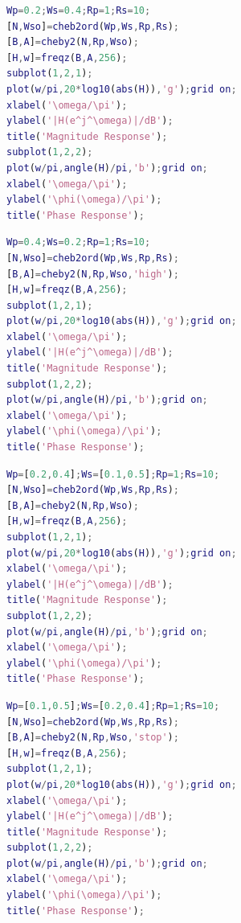 \documentclass[12pt,AutoFakeBold]{article}
\begin{document}
\begin{appendices}
\begin{lstlisting}[language=Matlab]
%低通
Wp=0.2;Ws=0.4;Rp=1;Rs=10;
[N,Wso]=cheb2ord(Wp,Ws,Rp,Rs);
[B,A]=cheby2(N,Rp,Wso);
[H,w]=freqz(B,A,256);
subplot(1,2,1);
plot(w/pi,20*log10(abs(H)),'g');grid on;
xlabel('\omega/\pi');
ylabel('|H(e^j^\omega)|/dB');
title('Magnitude Response');
subplot(1,2,2);
plot(w/pi,angle(H)/pi,'b');grid on;
xlabel('\omega/\pi');
ylabel('\phi(\omega)/\pi');
title('Phase Response');
\end{lstlisting}

\begin{lstlisting}[language=Matlab]
%高通
Wp=0.4;Ws=0.2;Rp=1;Rs=10;
[N,Wso]=cheb2ord(Wp,Ws,Rp,Rs);
[B,A]=cheby2(N,Rp,Wso,'high');
[H,w]=freqz(B,A,256);
subplot(1,2,1);
plot(w/pi,20*log10(abs(H)),'g');grid on;
xlabel('\omega/\pi');
ylabel('|H(e^j^\omega)|/dB');
title('Magnitude Response');
subplot(1,2,2);
plot(w/pi,angle(H)/pi,'b');grid on;
xlabel('\omega/\pi');
ylabel('\phi(\omega)/\pi');
title('Phase Response');
\end{lstlisting}

\begin{lstlisting}[language=Matlab]
%带通
Wp=[0.2,0.4];Ws=[0.1,0.5];Rp=1;Rs=10;
[N,Wso]=cheb2ord(Wp,Ws,Rp,Rs);
[B,A]=cheby2(N,Rp,Wso);
[H,w]=freqz(B,A,256);
subplot(1,2,1);
plot(w/pi,20*log10(abs(H)),'g');grid on;
xlabel('\omega/\pi');
ylabel('|H(e^j^\omega)|/dB');
title('Magnitude Response');
subplot(1,2,2);
plot(w/pi,angle(H)/pi,'b');grid on;
xlabel('\omega/\pi');
ylabel('\phi(\omega)/\pi');
title('Phase Response');
\end{lstlisting}

\begin{lstlisting}[language=Matlab]
%带阻
Wp=[0.1,0.5];Ws=[0.2,0.4];Rp=1;Rs=10;
[N,Wso]=cheb2ord(Wp,Ws,Rp,Rs);
[B,A]=cheby2(N,Rp,Wso,'stop');
[H,w]=freqz(B,A,256);
subplot(1,2,1);
plot(w/pi,20*log10(abs(H)),'g');grid on;
xlabel('\omega/\pi');
ylabel('|H(e^j^\omega)|/dB');
title('Magnitude Response');
subplot(1,2,2);
plot(w/pi,angle(H)/pi,'b');grid on;
xlabel('\omega/\pi');
ylabel('\phi(\omega)/\pi');
title('Phase Response');
\end{lstlisting}

\end{appendices}
\end{document}
